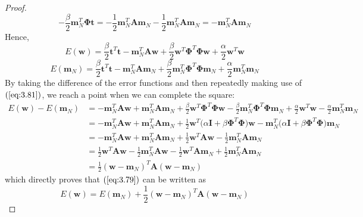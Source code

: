 \begin{proof}
\[            - \frac{\beta}{2} \mathbf{m}_N^T\mathbf{\Phi}\mathbf{t}
        =  
        -\frac{1}{2} \mathbf{m}_N^T\mathbf{A}\mathbf{m}_N
            -\frac{1}{2} \mathbf{m}_N^T\mathbf{A}\mathbf{m}_N
        = 
        -\mathbf{m}_N^T\mathbf{A}\mathbf{m}_N
    \] 
    Hence, 
    \[
        E(\mathbf{w})
        = \frac{\beta}{2} \mathbf{t}^T\mathbf{t} 
            -\mathbf{m}_N^T\mathbf{A}\mathbf{w}
            + \frac{\beta}{2} \mathbf{w}^T\mathbf{\Phi}^T\mathbf{\Phi}\mathbf{w}
            + \frac{\alpha}{2} \mathbf{w}^T\mathbf{w}
    \] 
    \[
        E(\mathbf{m}_N)
        = \frac{\beta}{2} \mathbf{t}^T\mathbf{t} 
            -\mathbf{m}_N^T\mathbf{A}\mathbf{m}_N
            + \frac{\beta}{2} \mathbf{m}_N^T\mathbf{\Phi}^T\mathbf{\Phi}\mathbf{m}_N
            + \frac{\alpha}{2} \mathbf{m}_N^T\mathbf{m}_N
    \]
    By taking the difference of the error functions and then
    repeatedly making use of $(\ref{eq:3.81})$, we reach a point
    when we can complete the square:
    \begin{align*}
        E(\mathbf{w}) - E(\mathbf{m}_N)
        &= -\mathbf{m}_N^T\mathbf{A}\mathbf{w} 
            + \mathbf{m}_N^T\mathbf{A}\mathbf{m}_N
            + \frac{\beta}{2} \mathbf{w}^T\mathbf{\Phi}^T\mathbf{\Phi}\mathbf{w}
            - \frac{\beta}{2} \mathbf{m}_N^T\mathbf{\Phi}^T\mathbf{\Phi}\mathbf{m}_N
            + \frac{\alpha}{2} \mathbf{w}^T\mathbf{w} 
            - \frac{\alpha}{2} \mathbf{m}_N^T\mathbf{m}_N \\
        &= -\mathbf{m}_N^T\mathbf{A}\mathbf{w} 
            + \mathbf{m}_N^T\mathbf{A}\mathbf{m}_N
            + \frac{1}{2} \mathbf{w}^T\big(
                \alpha \mathbf{I} + \beta \mathbf{\Phi}^T\mathbf{\Phi}\big) 
                \mathbf{w}
            - \mathbf{m}_N^T\big( 
                \alpha \mathbf{I} + \beta \mathbf{\Phi}^T\mathbf{\Phi}\big) 
                \mathbf{m}_N \\
        &= -\mathbf{m}_N^T\mathbf{A}\mathbf{w} 
            + \mathbf{m}_N^T\mathbf{A}\mathbf{m}_N
            + \frac{1}{2} \mathbf{w}^T\mathbf{A}\mathbf{w}
            - \frac{1}{2} \mathbf{m}_N^T\mathbf{A}\mathbf{m}_N \\
        &= \frac{1}{2} \mathbf{w}^T\mathbf{A}\mathbf{w}
            -\frac{1}{2} \mathbf{m}_N^T \mathbf{A}\mathbf{w}
            -\frac{1}{2} \mathbf{w}^T\mathbf{A}\mathbf{m}_N
            + \frac{1}{2} \mathbf{m}_N^T\mathbf{A}\mathbf{m}_N \\
        &= \frac{1}{2} (\mathbf{w} - \mathbf{m}_N)^T\mathbf{A}(\mathbf{w} - \mathbf{m}_N)
    \end{align*}
    which directly proves that $(\ref{eq:3.79})$ can be written as
    \begin{equation*}
        E(\mathbf{w}) = E(\mathbf{m}_N) + 
            \frac{1}{2} (\mathbf{w} - \mathbf{m}_N)^T\mathbf{A}(\mathbf{w} - \mathbf{m}_N)
        \tag{3.80}\label{eq:3.80}
    \end{equation*}
\end{proof}

